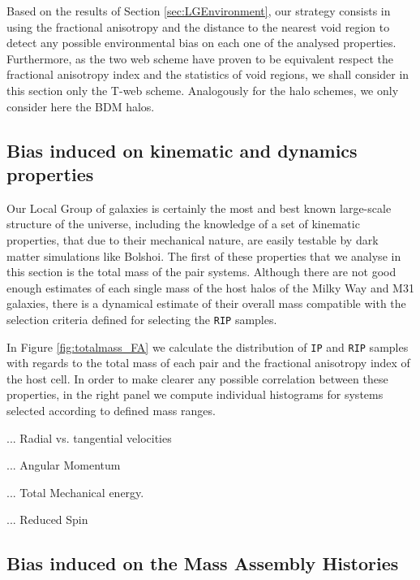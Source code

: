 \documentclass[a4,useAMS,usenatbib,usegraphicx]{latex/mn2e}
\begin{document}
Based on the results of Section \ref{sec:LGEnvironment}, our strategy 
consists in using the fractional anisotropy and the distance to the 
nearest void region to detect any possible environmental bias on each
one of the analysed properties. Furthermore, as the two web scheme have
proven to be equivalent respect the fractional anisotropy index and the
statistics of void regions, we shall consider in this section only the 
T-web scheme. Analogously for the halo schemes, we only consider here the
BDM halos.




\subsection{Bias induced on kinematic and dynamics properties}
\label{subsec:bias_kinematic}



Our Local Group of galaxies is certainly the most and best known 
large-scale structure of the universe, including the knowledge of a set of
kinematic properties, that due to their mechanical nature, are easily 
testable by dark matter simulations like Bolshoi. The first of these 
properties that we analyse in this section is the total mass of the pair 
systems. Although there are not good enough estimates of each single mass 
of the host halos of the Milky Way and M31 galaxies, there is a dynamical 
estimate of their overall mass  compatible with the 
selection criteria defined for selecting the \texttt{RIP} samples.



In Figure \ref{fig:totalmass_FA} we calculate the distribution of 
\texttt{IP} and \texttt{RIP} samples with regards to the total mass of 
each pair and the fractional anisotropy index of the host cell. In order
to make clearer any possible correlation between these properties, in the
right panel we compute individual histograms for systems selected according 
to defined mass ranges.


... Radial vs. tangential velocities

... Angular Momentum

... Total Mechanical energy.

... Reduced Spin


\subsection{Bias induced on the Mass Assembly Histories}
\label{subsec:bias_MAH}
\end{document}
